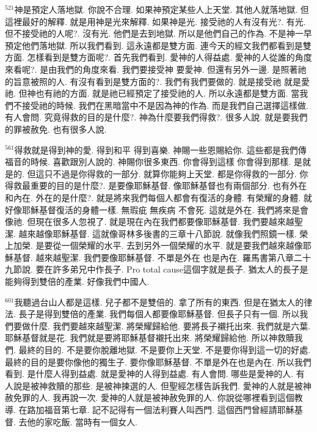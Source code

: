 \documentclass{book}
\begin{document}
$^{521}$神是預定人落地獄.
你說不合理.
如果神預定某些人上天堂.
其他人就落地獄.
但這裡最好的解釋.
就是用神是光來解釋.
如果神是光.
接受祂的人有沒有光?.
有光.
但不接受祂的人呢?.
沒有光.
他們是去到地獄.
所以是他們自己的作為.
不是神一早預定他們落地獄.
所以我們看到.
這永遠都是雙方面.
連今天的經文我們都看到是雙方面.
怎樣看到是雙方面呢?.
首先我們看到.
愛神的人得益處.
愛神的人從誰的角度來看呢?.
是由我們的角度來看.
我們要接受神 要愛神.
但還有另外一邊.
是照著祂的旨意被照的人.
有沒有看到是雙方面的?.
我們有我們要做的.
就是接受祂 就是愛祂.
但神也有祂的方面.
就是祂已經預定了接受祂的人.
所以永遠都是雙方面.
當我們不接受祂的時候.
我們在黑暗當中不是因為神的作為.
而是我們自己選擇這樣做.
有人會問.
究竟得救的目的是什麼?.
神為什麼要我們得救?.
很多人說.
就是要我們的罪被赦免.
也有很多人說.

$^{561}$得救就是得到神的愛.
得到和平 得到喜樂.
神賜一些恩賜給你.
這些都是我們傳福音的時候.
喜歡跟別人說的.
神賜你很多東西.
你會得到這樣 你會得到那樣.
是就是的.
但這只不過是你得救的一部分.
就算你能夠上天堂.
都是你得救的一部分.
你得救最重要的目的是什麼?.
是要像耶穌基督.
像耶穌基督也有兩個部分.
也有外在和內在.
外在的是什麼?.
就是將來我們每個人都會有復活的身體.
有榮耀的身體.
就好像耶穌基督復活的身體一樣.
無瑕疵 無疾病 不會死.
這就是外在.
我們將來是會像祂.
但現在很多人忽視了.
就是現在內在我們都要像耶穌基督.
我們要越來越聖潔.
越來越像耶穌基督.
這就像哥林多後書的三章十八節說.
就像我們照鏡一樣.
榮上加榮.
是要從一個榮耀的水平.
去到另外一個榮耀的水平.
就是要我們越來越像耶穌基督.
越來越聖潔.
我們要像耶穌基督.
不單是外在 也是內在.
羅馬書第八章二十九節說.
要在許多弟兄中作長子.
Pro total cause這個字就是長子.
猶太人的長子是能夠得到雙倍的產業.
好像我們中國人.

$^{601}$我聽過台山人都是這樣.
兒子都不是雙倍的.
拿了所有的東西.
但是在猶太人的律法.
長子是得到雙倍的產業.
我們每個人都要像耶穌基督.
但長子只有一個.
所以我們要做什麼.
我們要越來越聖潔.
將榮耀歸給他.
要將長子襯托出來.
我們就是六葉.
耶穌基督就是花.
我們就是要將耶穌基督襯托出來.
將榮耀歸給他.
所以神救贖我們.
最終的目的.
不是要你脫離地獄.
不是要你上天堂.
不是要你得到這一切的好處.
最終的目的是要你像他的獨生子.
要你像耶穌基督.
不單是外在也是內在.
所以我們看到.
是什麼人得到益處.
就是愛神的人得到益處.
有人會問.
哪些是愛神的人.
有人說是被神救贖的那些.
是被神揀選的人.
但聖經怎樣告訴我們.
愛神的人就是被神赦免罪的人.
我再說一次.
愛神的人就是被神赦免罪的人.
你說從哪裡看到這個教導.
在路加福音第七章.
記不記得有一個法利賽人叫西門.
這個西門曾經請耶穌基督.
去他的家吃飯.
當時有一個女人.
\end{document}
